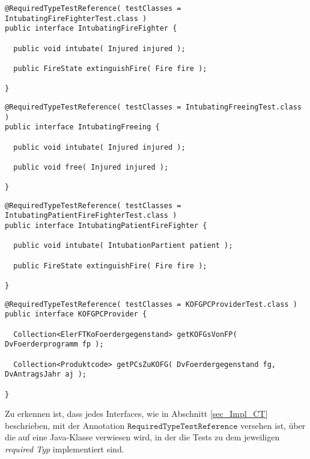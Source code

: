 \begin{lstlisting}[style = java, caption = Interface IntubatingFireFighter, captionpos = b, label = lst_interfaces_tei4]
@RequiredTypeTestReference( testClasses = IntubatingFireFighterTest.class )
public interface IntubatingFireFighter {

  public void intubate( Injured injured );

  public FireState extinguishFire( Fire fire );
  
}
\end{lstlisting}
\begin{lstlisting}[style = java, caption = Interface IntubatingFreeing, captionpos = b, label = lst_interfaces_tei5]
@RequiredTypeTestReference( testClasses = IntubatingFreeingTest.class )
public interface IntubatingFreeing {

  public void intubate( Injured injured );

  public void free( Injured injured );
  
}
\end{lstlisting}
\begin{lstlisting}[style = java, caption = Interface IntubatingPatientFireFighter, captionpos = b, label = lst_interfaces_tei6]
@RequiredTypeTestReference( testClasses = IntubatingPatientFireFighterTest.class )
public interface IntubatingPatientFireFighter {

  public void intubate( IntubationPartient patient );

  public FireState extinguishFire( Fire fire );
  
}
\end{lstlisting}
\begin{lstlisting}[style = java, caption = Interface KOFGPCProvider, captionpos = b, label = lst_interfaces_tei7]
@RequiredTypeTestReference( testClasses = KOFGPCProviderTest.class )
public interface KOFGPCProvider {

  Collection<ElerFTKoFoerdergegenstand> getKOFGsVonFP( DvFoerderprogramm fp );
 
  Collection<Produktcode> getPCsZuKOFG( DvFoerdergegenstand fg, DvAntragsJahr aj ); 
  
}
\end{lstlisting}
Zu erkennen ist, dass jedes Interfaces, wie in Abschnitt \ref{sec_Impl_CT} beschrieben, mit der Annotation $\texttt{RequiredTypeTestReference}$ versehen ist, über die auf eine Java-Klasse verwiesen wird, in der die Tests zu dem jeweiligen \emph{required Typ} implementiert sind.
\\\\
